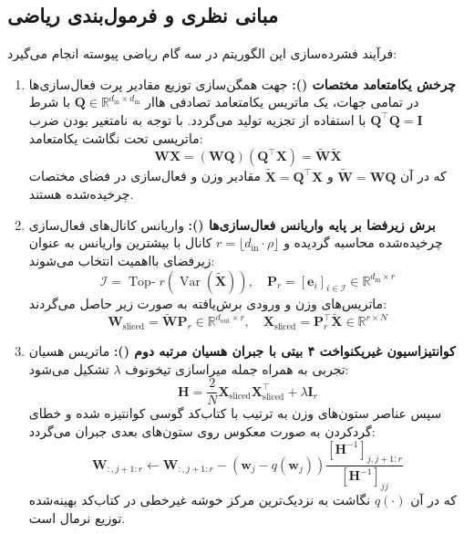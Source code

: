 \subsection{مبانی نظری و فرمول‌بندی ریاضی}
فرآیند فشرده‌سازی این الگوریتم در سه گام ریاضی پیوسته انجام می‌گیرد:
\begin{enumerate}
    \item \textbf{چرخش یکامتعامد مختصات ():}
    جهت همگن‌سازی توزیع مقادیر پرت فعال‌سازی‌ها در تمامی جهات، یک ماتریس یکامتعامد تصادفی هاار $\mathbf{Q} \in \mathbb{R}^{d_{\text{in}} \times d_{\text{in}}}$ با شرط $\mathbf{Q}^\top \mathbf{Q} = \mathbf{I}$ با استفاده از تجزیه  تولید می‌گردد. با توجه به نامتغیر بودن ضرب ماتریسی تحت نگاشت یکامتعامد:
    \begin{equation}
    \mathbf{W} \mathbf{X} = (\mathbf{W} \mathbf{Q}) (\mathbf{Q}^\top \mathbf{X}) = \tilde{\mathbf{W}} \tilde{\mathbf{X}}
    \end{equation}
    که در آن $\tilde{\mathbf{W}} = \mathbf{W} \mathbf{Q}$ و $\tilde{\mathbf{X}} = \mathbf{Q}^\top \mathbf{X}$ مقادیر وزن و فعال‌سازی در فضای مختصات چرخیده‌شده هستند.

    \item \textbf{برش زیرفضا بر پایه واریانس فعال‌سازی‌ها ():}
    واریانس کانال‌های فعال‌سازی چرخیده‌شده محاسبه گردیده و $r = \lfloor d_{\text{in}} \cdot \rho \rfloor$ کانال با بیشترین واریانس به عنوان زیرفضای بااهمیت انتخاب می‌شوند:
    \begin{equation}
    \mathcal{I} = \operatorname{Top-}r(\operatorname{Var}(\tilde{\mathbf{X}})), \quad \mathbf{P}_r = [\mathbf{e}_i]_{i \in \mathcal{I}} \in \mathbb{R}^{d_{\text{in}} \times r}
    \end{equation}
    ماتریس‌های وزن و ورودی برش‌یافته به صورت زیر حاصل می‌گردند:
    \begin{equation}
    \mathbf{W}_{\text{sliced}} = \tilde{\mathbf{W}} \mathbf{P}_r \in \mathbb{R}^{d_{\text{out}} \times r}, \quad \mathbf{X}_{\text{sliced}} = \mathbf{P}_r^\top \tilde{\mathbf{X}} \in \mathbb{R}^{r \times N}
    \end{equation}

    \item \textbf{کوانتیزاسیون غیریکنواخت ۴ بیتی با جبران هسیان مرتبه دوم ():}
    ماتریس هسیان تجربی به همراه جمله میراسازی تیخونوف $\lambda$ تشکیل می‌شود:
    \begin{equation}
    \mathbf{H} = \frac{2}{N} \mathbf{X}_{\text{sliced}} \mathbf{X}_{\text{sliced}}^\top + \lambda \mathbf{I}_r
    \end{equation}
    سپس عناصر ستون‌های وزن به ترتیب با کتاب‌کد گوسی  کوانتیزه شده و خطای گردکردن به صورت معکوس روی ستون‌های بعدی جبران می‌گردد:
    \begin{equation}
    \mathbf{W}_{:, j+1:r} \leftarrow \mathbf{W}_{:, j+1:r} - \left( \mathbf{w}_j - q(\mathbf{w}_j) \right) \frac{[\mathbf{H}^{-1}]_{j, j+1:r}}{[\mathbf{H}^{-1}]_{jj}}
    \end{equation}
    که در آن $q(\cdot)$ نگاشت به نزدیک‌ترین مرکز خوشه غیرخطی در کتاب‌کد بهینه‌شده توزیع نرمال است.
\end{enumerate}

